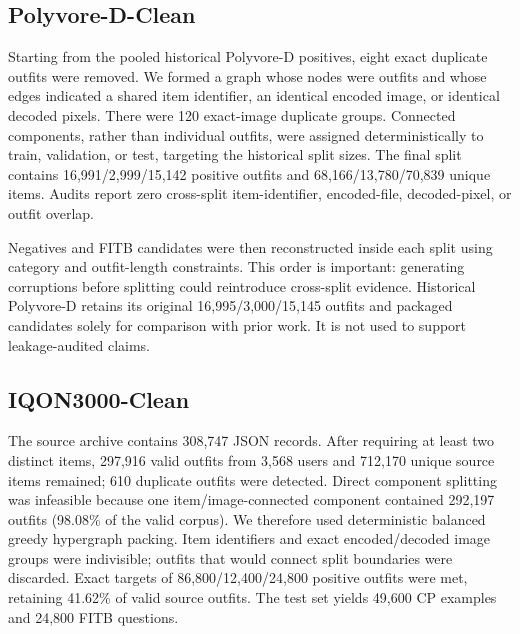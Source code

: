 \documentclass[preprint,12pt]{elsarticle}
\begin{document}
\subsection{Polyvore-D-Clean}

Starting from the pooled historical Polyvore-D positives, eight exact duplicate outfits were removed. We formed a graph whose nodes were outfits and whose edges indicated a shared item identifier, an identical encoded image, or identical decoded pixels. There were 120 exact-image duplicate groups. Connected components, rather than individual outfits, were assigned deterministically to train, validation, or test, targeting the historical split sizes. The final split contains 16,991/2,999/15,142 positive outfits and 68,166/13,780/70,839 unique items. Audits report zero cross-split item-identifier, encoded-file, decoded-pixel, or outfit overlap.

Negatives and FITB candidates were then reconstructed inside each split using category and outfit-length constraints. This order is important: generating corruptions before splitting could reintroduce cross-split evidence. Historical Polyvore-D retains its original 16,995/3,000/15,145 outfits and packaged candidates solely for comparison with prior work. It is not used to support leakage-audited claims.

\subsection{IQON3000-Clean}

The source archive contains 308,747 JSON records. After requiring at least two distinct items, 297,916 valid outfits from 3,568 users and 712,170 unique source items remained; 610 duplicate outfits were detected. Direct component splitting was infeasible because one item/image-connected component contained 292,197 outfits (98.08\% of the valid corpus). We therefore used deterministic balanced greedy hypergraph packing. Item identifiers and exact encoded/decoded image groups were indivisible; outfits that would connect split boundaries were discarded. Exact targets of 86,800/12,400/24,800 positive outfits were met, retaining 41.62\% of valid source outfits. The test set yields 49,600 CP examples and 24,800 FITB questions.
\end{document}
